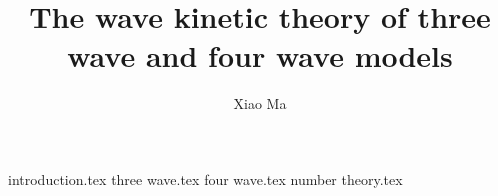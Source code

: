 \documentclass[12pt]{puthesis}
\title{The wave kinetic theory of three wave and four wave models}
\author{Xiao Ma}
\theoremstyle{definition}
\theoremstyle{remark}
\begin{document}
{introduction.tex}
{three wave.tex}
{four wave.tex}
{number theory.tex}




 

\end{document}
